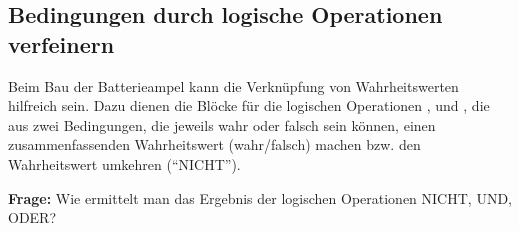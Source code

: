 
\subsection{Bedingungen durch logische Operationen verfeinern}
Beim Bau der Batterieampel kann die Verknüpfung von Wahrheitswerten hilfreich sein. Dazu dienen die Blöcke für die logischen Operationen ,  und , die aus zwei Bedingungen, die jeweils wahr oder falsch sein können, einen zusammenfassenden Wahrheitswert (wahr/falsch) machen bzw. den Wahrheitswert umkehren (\enquote{NICHT}).

\begin{ziel}
	\textbf{Frage:} Wie ermittelt man das Ergebnis der logischen Operationen NICHT, UND, ODER?
\end{ziel}

